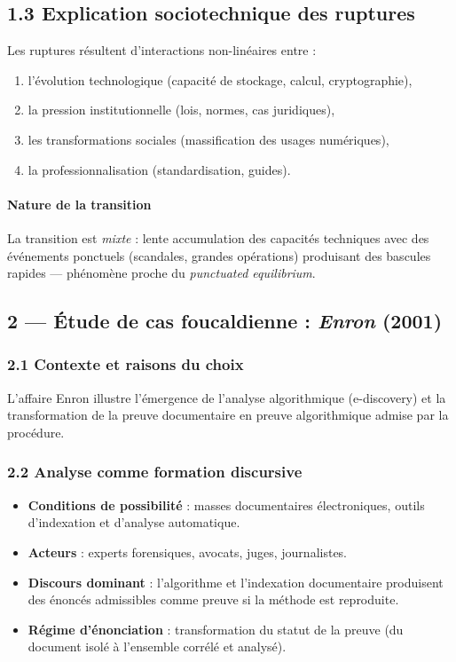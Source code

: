 \documentclass[12pt,a4paper]{article}
\begin{document}
\subsection{1.3 Explication sociotechnique des ruptures}
Les ruptures résultent d'interactions non-linéaires entre :
\begin{enumerate}
  \item l'évolution technologique (capacité de stockage, calcul, cryptographie),
  \item la pression institutionnelle (lois, normes, cas juridiques),
  \item les transformations sociales (massification des usages numériques),
  \item la professionnalisation (standardisation, guides).
\end{enumerate}

\paragraph{Nature de la transition}
La transition est \emph{mixte} : lente accumulation des capacités techniques avec des événements ponctuels (scandales, grandes opérations) produisant des bascules rapides — phénomène proche du \emph{punctuated equilibrium}.

\subsection{2 — Étude de cas foucaldienne : \emph{Enron} (2001)}
\subsubsection{2.1 Contexte et raisons du choix}
L'affaire Enron illustre l'émergence de l'analyse algorithmique (e-discovery) et la transformation de la preuve documentaire en preuve algorithmique admise par la procédure.

\subsubsection{2.2 Analyse comme formation discursive}
\begin{itemize}
  \item \textbf{Conditions de possibilité} : masses documentaires électroniques, outils d'indexation et d'analyse automatique.
  \item \textbf{Acteurs} : experts forensiques, avocats, juges, journalistes.
  \item \textbf{Discours dominant} : l'algorithme et l'indexation documentaire produisent des énoncés admissibles comme preuve si la méthode est reproduite.
  \item \textbf{Régime d'énonciation} : transformation du statut de la preuve (du document isolé à l'ensemble corrélé et analysé).
\end{itemize}
\end{document}
